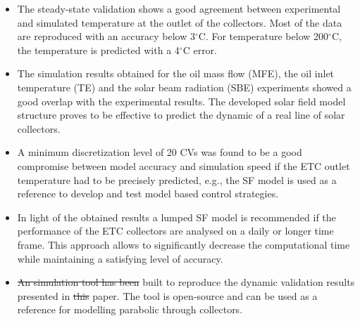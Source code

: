 \documentclass[final,3p,times,review]{elsarticle}
\providecommand{\DIFadd}[1]{{\protect\color{blue}\uwave{#1}}} %
\providecommand{\DIFdel}[1]{{\protect\color{red}\sout{#1}}}                      %
\providecommand{\DIFaddbegin}{} %
\providecommand{\DIFaddend}{} %
\providecommand{\DIFdelbegin}{} %
\providecommand{\DIFdelend}{} %
\begin{document}
 \begin{itemize} 
\item The steady-state validation shows a good agreement between experimental and simulated temperature at the outlet of the collectors. Most of the data are reproduced with an accuracy below 3$^{\circ}$C. For temperature below 200$^{\circ}$C, the temperature is predicted with a  4$^{\circ}$C error.
\item The simulation results obtained for the oil mass flow   (MFE), the oil inlet temperature   (TE) and the solar  beam radiation (SBE) experiments showed a good overlap with the experimental results. The developed solar field model structure proves to be effective to predict the dynamic of a real line of solar collectors.
%
%
\item A minimum discretization level of 20 CVs was found to be a good compromise between model accuracy and simulation speed if the ETC outlet temperature had to be precisely predicted, e.g., the  SF model is used as a reference to develop and test model based control strategies.
%
\item In light of the obtained results a lumped SF model is recommended if the performance of the ETC collectors are analysed on a daily or longer time frame. This approach allows to significantly decrease the computational time while maintaining a satisfying level of accuracy.
%
\item \DIFdelbegin \DIFdel{An simulation tool has been }\DIFdelend \DIFaddbegin \DIFadd{A simulation tool was }\DIFaddend built to reproduce the dynamic validation results presented in \DIFdelbegin \DIFdel{this }\DIFdelend \DIFaddbegin \DIFadd{the }\DIFaddend paper. The tool is open-source and can be used as a reference for modelling parabolic through collectors.
 \end{itemize} 
\end{document}
